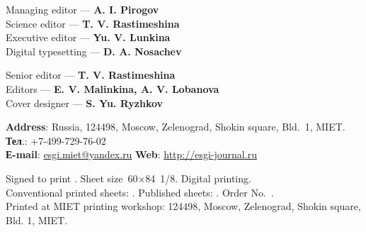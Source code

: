 \begin{otherlanguage}{english}
\begin{minipage}[t]{.48\textwidth}
\begin{flushleft}
  \scriptsize
        Managing editor — \textbf{A. I. Pirogov}\\
Science editor — \textbf{T. V. Rastimeshina} \\
Executive editor — \textbf{Yu. V. Lunkina }\\
Digital typesetting — \textbf{D. A. Nosachev}
    \end{flushleft}
\end{minipage}\hspace{0.04\textwidth}
\begin{minipage}[t]{.48\textwidth}
    \begin{flushleft}
        \scriptsize
        Senior editor — \textbf{T. V. Rastimeshina}\\
        Editors — \textbf{E. V. Malinkina, A. V. Lobanova}\\
        Cover designer — \textbf{S. Yu. Ryzhkov}
    \end{flushleft}
\end{minipage}

\begin{flushleft}
    \scriptsize
    \textbf{Address}: Russia, 124498, Moscow, Zelenograd, Shokin square, Bld. 1, MIET.\\
    \textbf{Тел}.: +7-499-729-76-02\\
    \textbf{Е-mail}: \href{mailto:esgi.miet@yandex.ru}{esgi.miet@yandex.ru} \hspace{3em}
    \textbf{Web}: \url{http://esgi-journal.ru}

     \vspace{1em}
    Signed to print \esgiPDate. Sheet size 60\(×\)84 1/8. Digital printing.\\
    Conventional printed sheets: \esgiUPL{}. Published sheets: \esgiUIL{}. Order No.~\esgiPRN{}.\\
    Printed at MIET printing workshop: 124498, Moscow, Zelenograd, Shokin square, Bld. 1, MIET.
\end{flushleft}

\end{otherlanguage}

\normalsize
\setmainlinespread

\restoregeometry